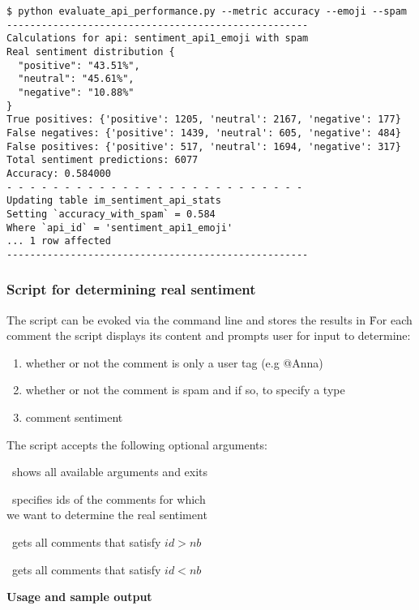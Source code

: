 \begin{verbatim}
$ python evaluate_api_performance.py --metric accuracy --emoji --spam
----------------------------------------------------
Calculations for api: sentiment_api1_emoji with spam
Real sentiment distribution {
  "positive": "43.51%", 
  "neutral": "45.61%", 
  "negative": "10.88%"
}
True positives: {'positive': 1205, 'neutral': 2167, 'negative': 177} 
False negatives: {'positive': 1439, 'neutral': 605, 'negative': 484} 
False positives: {'positive': 517, 'neutral': 1694, 'negative': 317} 
Total sentiment predictions: 6077 
Accuracy: 0.584000 
- - - - - - - - - - - - - - - - - - - - - - - - - -
Updating table im_sentiment_api_stats
Setting `accuracy_with_spam` = 0.584 
Where `api_id` = 'sentiment_api1_emoji' 
... 1 row affected
----------------------------------------------------
\end{verbatim}


\subsubsection*{Script for determining real sentiment}
\noindent The \emph{} script can be evoked via the command line and stores the results in \.
For each comment the script displays its content and prompts user for input to determine: 
 \begin{enumerate}
  \item whether or not the comment is only a user tag (e.g @Anna)
  \item whether or not the comment is spam and if so, to specify a type
  \item comment sentiment
\end{enumerate}
The script accepts the following optional arguments:
\begin{description}[labelindent=0.7cm, leftmargin=1.7cm]
\singlespacing
 \item[--help ] shows all available arguments and exits
 \item[-ideq \textless nbs\textgreater ] specifies ids of the comments for which \\ we want to determine the real sentiment
 \item[-idgt \textless nb\textgreater] gets all comments that satisfy $id > nb$
 \item[-idlt \textless nb\textgreater] gets all comments that satisfy $id < nb$
\end{description}
\textbf{Usage and sample output}

